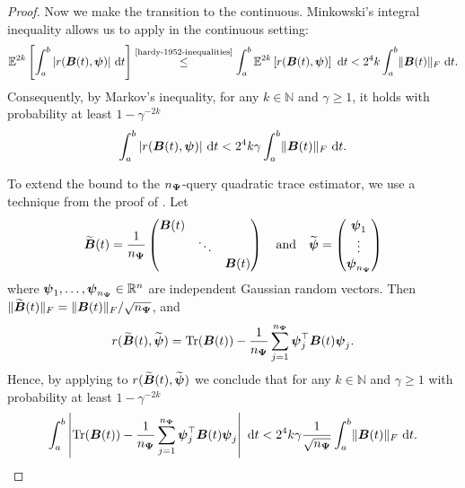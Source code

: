 \documentclass[12pt]{article}
\begin{document}
\begin{proof}
    Now we make the transition to the continuous. Minkowski's integral inequality \cite[theorem 202]{hardy-1952-inequalities} allows us to apply  in the continuous setting: 
    \begin{equation}
        \mathbb{E}^{2 k}\left[ \int_{a}^{b} |r(\mtx{B}(t), \vct{\psi})|~\mathrm{d}t  \right]
        \stackrel{\text{\cite{hardy-1952-inequalities}}}{\leq} \int_{a}^{b} \mathbb{E}^{2 k}\left[ r(\mtx{B}(t), \vct{\psi}) \right]~\mathrm{d}t
        < 2^4 k \int_{a}^{b} \lVert \mtx{B}(t) \rVert _F~\mathrm{d}t.
    \end{equation}
    Consequently, by Markov's inequality, for any $k \in \mathbb{N}$ and $\gamma \geq 1$, it holds with probability at least $1 - \gamma^{-2 k}$
    \begin{equation}
        \int_{a}^{b} |r(\boldsymbol{B}(t), \boldsymbol{\psi})|~\mathrm{d}t < 2^4 k \gamma \int_{a}^{b} \lVert \boldsymbol{B}(t) \rVert _F~\mathrm{d}t.
        \label{equ:hutchinson-trace-onequery-uniform}
    \end{equation}

    To extend the bound to the $n_{\boldsymbol{\Psi}}$-query quadratic trace estimator, we use a technique from the proof of \cite[theorem 1]{cortinovis-2022-randomized-trace}. Let
    \begin{equation}
        \widetilde{\boldsymbol{B}}(t)
        = \frac{1}{n_{\boldsymbol{\Psi}}} \begin{pmatrix}
            \boldsymbol{B}(t) & & \\
            & \ddots & \\
            & & \boldsymbol{B}(t)
        \end{pmatrix}
        \quad \text{and} \quad
        \widetilde{\boldsymbol{\psi}} = \begin{pmatrix}
            \boldsymbol{\psi}_1 \\
            \vdots \\
            \boldsymbol{\psi}_{n_{\boldsymbol{\Psi}}}
        \end{pmatrix}
    \end{equation}
    where $\boldsymbol{\psi}_1, \dots, \boldsymbol{\psi}_{n_{\boldsymbol{\Psi}}} \in \mathbb{R}^{n}$ are independent Gaussian random vectors. Then $\lVert \widetilde{\boldsymbol{B}}(t) \rVert _F = \lVert \boldsymbol{B}(t) \rVert _F / \sqrt{n_{\boldsymbol{\Psi}}}$, and
    \begin{equation}
        r(\widetilde{\boldsymbol{B}}(t), \widetilde{\boldsymbol{\psi}}) = \operatorname{Tr}(\boldsymbol{B}(t)) - \frac{1}{n_{\boldsymbol{\Psi}}} \sum_{j=1}^{n_{\boldsymbol{\Psi}}} \boldsymbol{\psi}_j^{\top} \boldsymbol{B}(t) \boldsymbol{\psi}_j.
    \end{equation}
    Hence, by applying  to $r(\widetilde{\boldsymbol{B}}(t), \widetilde{\boldsymbol{\psi}})$ we conclude that for any $k \in \mathbb{N}$ and $\gamma \geq 1$ with probability at least $1 - \gamma^{-2 k}$
    \begin{equation}
        \int_{a}^{b} \left| \operatorname{Tr}(\boldsymbol{B}(t)) - \frac{1}{n_{\boldsymbol{\Psi}}} \sum_{j=1}^{n_{\boldsymbol{\Psi}}} \boldsymbol{\psi}_j^{\top} \boldsymbol{B}(t) \boldsymbol{\psi}_j \right| ~ \mathrm{d}t
        < 2^4 k \gamma \frac{1}{\sqrt{n_{\boldsymbol{\Psi}}}} \int_{a}^{b} \lVert \boldsymbol{B}(t) \rVert _F~\mathrm{d}t.
    \end{equation}


\end{proof}
\end{document}
